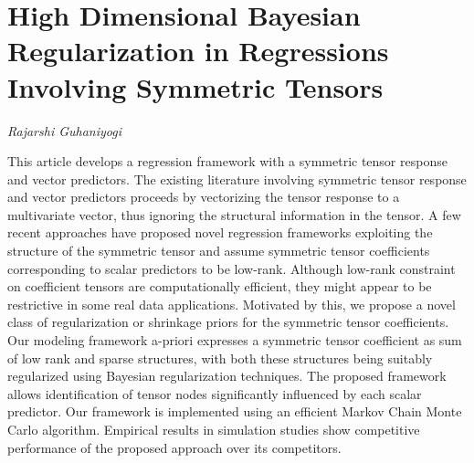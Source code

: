 \documentclass[../booklet.tex]{subfiles}
\begin{document}
\section[High Dimensional Bayesian Regularization in Regressions Involving Symmetric Tensors. {\it Rajarshi Guhaniyogi}]{High Dimensional Bayesian Regularization in Regressions Involving Symmetric Tensors}

\begin{center}
  {\it Rajarshi Guhaniyogi}
\end{center}

\vskip 0.8cm


This article develops a regression framework with a symmetric tensor response and vector predictors. The existing literature involving symmetric tensor response and vector predictors proceeds by vectorizing the tensor response to a multivariate vector, thus ignoring the structural information in the tensor. A few recent approaches have proposed novel regression frameworks exploiting the structure of the symmetric tensor and assume symmetric tensor coefficients corresponding to scalar predictors to be low-rank. Although low-rank constraint on coefficient tensors are computationally efficient, they might appear to be restrictive in some real data applications.  Motivated by this, we propose a novel class of regularization or shrinkage priors for the symmetric tensor coefficients. Our modeling framework a-priori expresses a symmetric tensor coefficient as sum of low rank and sparse structures, with both these structures being suitably regularized using Bayesian regularization techniques. The proposed framework allows identification of tensor nodes significantly influenced by each scalar predictor. Our framework is implemented using an efficient Markov Chain Monte Carlo algorithm. Empirical results in simulation studies show competitive performance of the proposed approach over its competitors.

\end{document}
